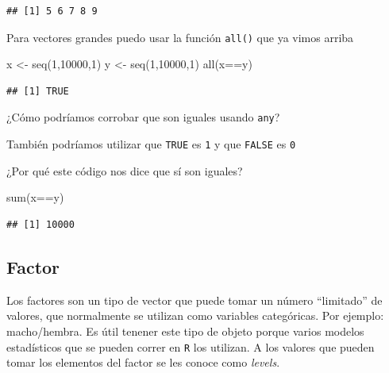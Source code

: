 \documentclass[
]{book}
\newenvironment{Shaded}{\begin{snugshade}}{\end{snugshade}}
\newcommand{\DecValTok}[1]{\textcolor[rgb]{0.00,0.00,0.81}{#1}}
\newcommand{\FunctionTok}[1]{\textcolor[rgb]{0.00,0.00,0.00}{#1}}
\newcommand{\NormalTok}[1]{#1}
\newcommand{\OtherTok}[1]{\textcolor[rgb]{0.56,0.35,0.01}{#1}}
\newcommand{\SpecialCharTok}[1]{\textcolor[rgb]{0.00,0.00,0.00}{#1}}
\begin{document}
\begin{verbatim}
## [1] 5 6 7 8 9
\end{verbatim}

Para vectores grandes puedo usar la función \texttt{all()} que ya vimos arriba

\begin{Shaded}
\begin{Highlighting}[]
\NormalTok{x }\OtherTok{\textless{}{-}} \FunctionTok{seq}\NormalTok{(}\DecValTok{1}\NormalTok{,}\DecValTok{10000}\NormalTok{,}\DecValTok{1}\NormalTok{)}
\NormalTok{y }\OtherTok{\textless{}{-}} \FunctionTok{seq}\NormalTok{(}\DecValTok{1}\NormalTok{,}\DecValTok{10000}\NormalTok{,}\DecValTok{1}\NormalTok{)}
\FunctionTok{all}\NormalTok{(x}\SpecialCharTok{==}\NormalTok{y)}
\end{Highlighting}
\end{Shaded}

\begin{verbatim}
## [1] TRUE
\end{verbatim}

¿Cómo podríamos corrobar que son iguales usando \texttt{any}?

También podríamos utilizar que \texttt{TRUE} es \texttt{1} y que \texttt{FALSE} es \texttt{0}

¿Por qué este código nos dice que sí son iguales?

\begin{Shaded}
\begin{Highlighting}[]
\FunctionTok{sum}\NormalTok{(x}\SpecialCharTok{==}\NormalTok{y)}
\end{Highlighting}
\end{Shaded}

\begin{verbatim}
## [1] 10000
\end{verbatim}

\hypertarget{factor}{%
\subsection{Factor}\label{factor}}

Los factores son un tipo de vector que puede tomar un número ``limitado'' de valores, que normalmente se utilizan como variables categóricas. Por ejemplo: macho/hembra. Es útil tenener este tipo de objeto porque varios modelos estadísticos que se pueden correr en \texttt{R} los utilizan. A los valores que pueden tomar los elementos del factor se les conoce como \emph{levels}.
\end{document}
